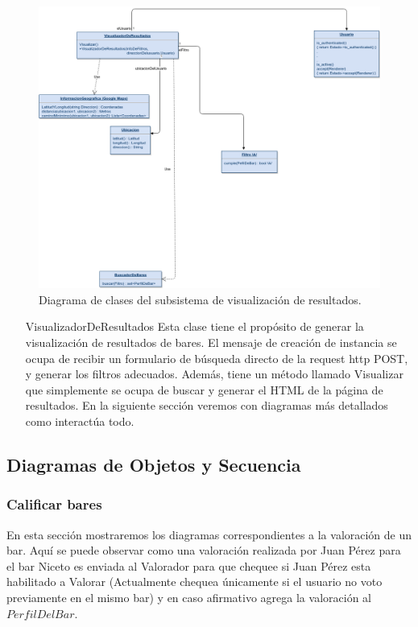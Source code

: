 \begin{figure}[H]
  \centering
  \includegraphics[width=\textwidth]{diagramas/visualizador_clases.png}
  \caption{\normalfont Diagrama de clases del subsistema de visualización de resultados.}
\end{figure}

\begin{itemize}
  \item[\footnotesize{VisualizadorDeResultados}] Esta clase tiene el propósito de generar la visualización de resultados de bares. El mensaje de creación de instancia se ocupa de recibir un formulario de búsqueda directo de la request http POST, y generar los filtros adecuados.
    Además, tiene un m\'etodo llamado Visualizar que simplemente se ocupa de buscar y generar el HTML de la página de resultados. En la siguiente sección veremos con diagramas más detallados como interactúa todo.
\end{itemize}


\subsection{Diagramas de Objetos y Secuencia}

\subsubsection{Calificar bares}

En esta sección mostraremos los diagramas correspondientes a la valoración de un bar. Aquí se puede observar como una valoración realizada por Juan P\'erez para el bar Niceto es enviada al Valorador para que chequee si Juan P\'erez esta habilitado a Valorar (Actualmente chequea únicamente si el usuario no voto previamente en el mismo bar) y en caso afirmativo agrega la valoración al $Perfil Del Bar$.

